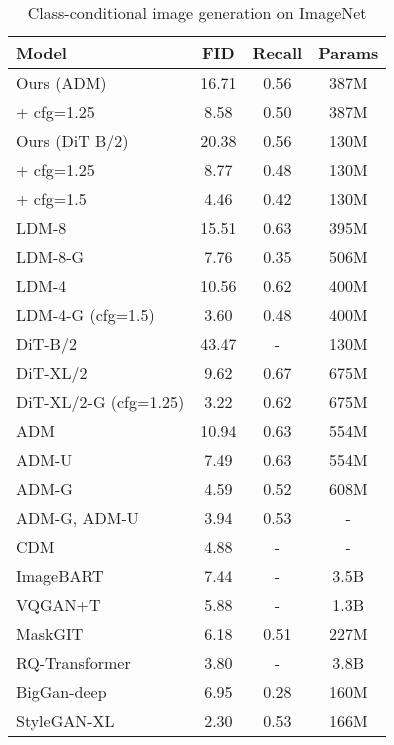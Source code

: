 \documentclass{article}
\theoremstyle{plain}
\theoremstyle{definition}
\theoremstyle{remark}
\begin{document}
\begin{table}[t]
    \centering
    \begin{tabular}{l c c c}
        \toprule
    Model & FID & Recall & Params \\
    \midrule
    Ours (ADM) & 16.71 & 0.56 & 387M \\
    + cfg=1.25 & 8.58 & 0.50 & 387M \\
Ours (DiT B/2) & 20.38 & 0.56 & 130M \\
    + cfg=1.25 & 8.77 & 0.48 & 130M \\
    + cfg=1.5 & 4.46 & 0.42 & 130M \\
    \midrule
    LDM-8 \cite{rombach2022high} & 15.51 & 0.63 & 395M \\
    LDM-8-G & 7.76 & 0.35 & 506M \\
    LDM-4 & 10.56 & 0.62 & 400M \\
    LDM-4-G (cfg=1.5) & 3.60 & 0.48 & 400M \\
    \midrule
    DiT-B/2 \cite{Peebles2022DiT} & 43.47 & - & 130M \\
    DiT-XL/2 & 9.62 & 0.67 & 675M \\
    DiT-XL/2-G (cfg=1.25) & 3.22 & 0.62 & 675M \\
    \midrule
    ADM \cite{dhariwal2021diffusion} & 10.94 & 0.63 & 554M \\
    ADM-U & 7.49 & 0.63 & 554M \\
    ADM-G & 4.59 & 0.52 & 608M \\
    ADM-G, ADM-U & 3.94 & 0.53 & - \\
    \midrule
    CDM \cite{ho2022cdm} & 4.88 & - & - \\
    \midrule
    ImageBART \cite{esser2021imagebart} & 7.44 & - & 3.5B \\
    \midrule
    VQGAN+T \cite{esser2021taming} & 5.88 & - & 1.3B \\
    MaskGIT \cite{chang2022maskgit} & 6.18 & 0.51 & 227M \\
    RQ-Transformer \cite{lee2022autoregressive} & 3.80 & - & 3.8B \\
    \midrule
    BigGan-deep \cite{brock2018large} & 6.95 & 0.28 & 160M \\
    StyleGAN-XL \cite{sauer2022stylegan} & 2.30 & 0.53 & 166M \\
    \bottomrule
    \end{tabular}
    \vspace{2mm}
    \caption{Class-conditional image generation on ImageNet }
    \label{tab:full_imagenet}
\end{table}
\end{document}
